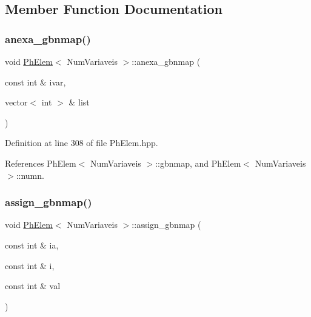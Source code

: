 \subsection{Member Function Documentation}
\mbox{\label{classPhElem_a4da3f8bc24014789f4685c9a611a11dc}} 
\subsubsection{\texorpdfstring{anexa\+\_\+gbnmap()}{anexa\_gbnmap()}}
{\footnotesize\ttfamily void \hyperlink{classPhElem}{Ph\+Elem}$<$ Num\+Variaveis $>$\+::anexa\+\_\+gbnmap (\begin{DoxyParamCaption}\item[{const int \&}]{ivar,  }\item[{vector$<$ int $>$ \&}]{list }\end{DoxyParamCaption})\hspace{0.3cm}{\ttfamily [inherited]}}



Definition at line 308 of file Ph\+Elem.\+hpp.



References Ph\+Elem$<$ Num\+Variaveis $>$\+::gbnmap, and Ph\+Elem$<$ Num\+Variaveis $>$\+::numn.

\mbox{\label{classPhElem_ac6ea940519c924130a4cb44bbab2a31d}} 
\subsubsection{\texorpdfstring{assign\+\_\+gbnmap()}{assign\_gbnmap()}}
{\footnotesize\ttfamily void \hyperlink{classPhElem}{Ph\+Elem}$<$ Num\+Variaveis $>$\+::assign\+\_\+gbnmap (\begin{DoxyParamCaption}\item[{const int \&}]{ia,  }\item[{const int \&}]{i,  }\item[{const int \&}]{val }\end{DoxyParamCaption})\hspace{0.3cm}{\ttfamily [inherited]}}



